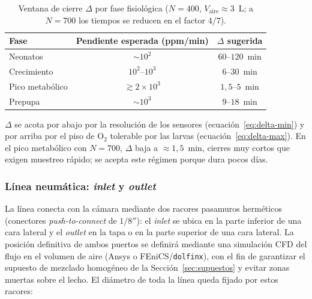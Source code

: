 \begin{table}[htbp]
  \centering
  \caption{Ventana de cierre $\Delta$ por fase fisiológica
  ($N = 400$, $V_{\mathrm{aire}} \approx 3$~L; a $N = 700$ los tiempos se
  reducen en el factor $4/7$).}
  \label{tab:delta-adaptativo}
  \begin{tabular}{lcc}
    \hline
    Fase & Pendiente esperada (ppm/min) & $\Delta$ sugerida \\
    \hline
    Neonatos      & $\sim 10^2$  & $60$--$120$~min \\
    Crecimiento   & $10^2$--$10^3$ & $6$--$30$~min \\
    Pico metabólico & $\gtrsim 2 \times 10^3$ & $1{,}5$--$5$~min \\
    Prepupa       & $\sim 10^3$  & $9$--$18$~min \\
    \hline
  \end{tabular}
\end{table}

\begin{remark}\label{rem:delta-operativo}
$\Delta$ se acota por abajo por la resolución de los sensores
(ecuación~\eqref{eq:delta-min}) y por arriba por el piso de O$_2$ tolerable por
las larvas (ecuación~\eqref{eq:delta-max}). En el pico metabólico con
$N = 700$, $\Delta$ baja a $\approx 1{,}5$~min, cierres muy cortos que exigen
muestreo rápido; se acepta este régimen porque dura pocos días.
\end{remark}

\subsubsection{Línea neumática: \emph{inlet} y \emph{outlet}}

La línea conecta con la cámara mediante dos racores pasamuros herméticos
(conectores \emph{push-to-connect} de $1/8''$): el \emph{inlet} se ubica en
la parte inferior de una cara lateral y el \emph{outlet} en la tapa o en la
parte superior de una cara lateral. La posición definitiva de ambos puertos
se definirá mediante una simulación CFD del flujo en el volumen de aire
(Ansys o FEniCS/\texttt{dolfinx}), con el fin de garantizar el supuesto de
mezclado homogéneo de la Sección~\ref{sec:supuestos} y evitar zonas muertas
sobre el lecho. El diámetro de toda la línea queda fijado por estos racores:

